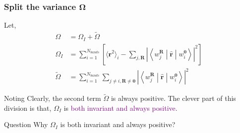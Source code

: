 \documentclass{beamer}
\begin{document}
  \begin{frame}
    \frametitle{Split the variance \(\mathbf{\Omega}\)}
    
    Let, 
    \begin{equation}
      \begin{aligned}
        \Omega &= \Omega_I + \widetilde{\Omega}\\
        \Omega_I &= \sum_{i=1}^{N_{bands}}\left[\langle\mathbf{r}^2\rangle_i - \sum_{j,\mathbf{R}}\left|\left\langle{}w_j^{\mathbf{R}}\middle|\widehat{\mathbf{r}}\middle|w_i^{\mathbf{0}}\right\rangle\right|^2\right]\\
        \widetilde{\Omega} &= \sum_{i=1}^{N_{bands}}\sum_{j\ne{}i,\mathbf{R}\ne\mathbf{0}}\left|\left\langle{}w_j^{\mathbf{R}}\middle|\widehat{\mathbf{r}}\middle|w_i^{\mathbf{0}}\right\rangle\right|^2
      \end{aligned}
    \end{equation}

    \begin{block}{Noting}
      Clearly, the second term \(\widetilde{\Omega}\) is always positive. The clever part of this division is that, \(\Omega_I\) is \textcolor{purple}{both invariant and always positive}.
    \end{block}

    \begin{alertblock}{Question}
      Why \(\Omega_I\) is both invariant and always positive? 
    \end{alertblock}

  \end{frame}
\end{document}
